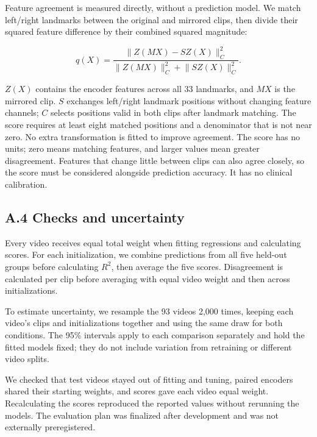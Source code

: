 \documentclass{article}
\begin{document}

Feature agreement is measured directly, without a prediction model. We
match left/right landmarks between the original and mirrored clips, then
divide their squared feature difference by their combined squared
magnitude:

\[
q(X)=
\frac{\lVert Z(MX)-SZ(X)\rVert_C^2}
{\lVert Z(MX)\rVert_C^2+\lVert SZ(X)\rVert_C^2}.
\]

\(Z(X)\) contains the encoder features across all 33 landmarks, and
\(MX\) is the mirrored clip. \(S\) exchanges left/right landmark
positions without changing feature channels; \(C\) selects positions
valid in both clips after landmark matching. The score requires at least
eight matched positions and a denominator that is not near zero. No
extra transformation is fitted to improve agreement. The score has no
units; zero means matching features, and larger values mean greater
disagreement. Features that change little between clips can also agree
closely, so the score must be considered alongside prediction accuracy.
It has no clinical calibration.

\FloatBarrier{}

\subsection{A.4 Checks and
uncertainty}\label{a.4-checks-and-uncertainty}

Every video receives equal total weight when fitting regressions and
calculating scores. For each initialization, we combine predictions from
all five held-out groups before calculating \(R^2\), then average the
five scores. Disagreement is calculated per clip before averaging with
equal video weight and then across initializations.

To estimate uncertainty, we resample the 93 videos 2,000 times, keeping
each video's clips and initializations together and using the same draw
for both conditions. The 95\% intervals apply to each comparison
separately and hold the fitted models fixed; they do not include
variation from retraining or different video splits.

We checked that test videos stayed out of fitting and tuning, paired
encoders shared their starting weights, and scores gave each video equal
weight. Recalculating the scores reproduced the reported values without
rerunning the models. The evaluation plan was finalized after
development and was not externally preregistered.
\end{document}
